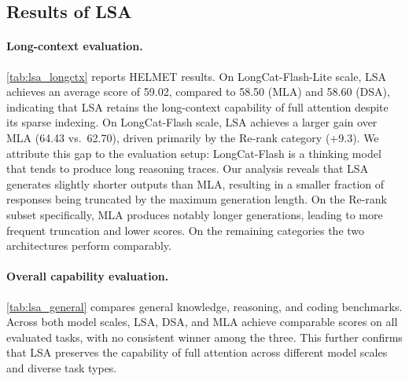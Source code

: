 \documentclass{article}
\newcommand{\longcat}{LongCat-Flash-Lite\xspace}
\begin{document}
\subsection{Results of LSA}
\label{sec:exp_results}

\paragraph{Long-context evaluation.}
\cref{tab:lsa_longctx} reports HELMET results. On \longcat scale, LSA achieves an average score of 59.02, compared to 58.50 (MLA) and 58.60 (DSA), indicating that LSA retains the long-context capability of full attention despite its sparse indexing. On LongCat-Flash scale, LSA achieves a larger gain over MLA (64.43 vs.\ 62.70), driven primarily by the Re-rank category (+9.3). We attribute this gap to the evaluation setup: LongCat-Flash is a thinking model that tends to produce long reasoning traces. Our analysis reveals that LSA generates slightly shorter outputs than MLA, resulting in a smaller fraction of responses being truncated by the maximum generation length. On the Re-rank subset specifically, MLA produces notably longer generations, leading to more frequent truncation and lower scores. On the remaining categories the two architectures perform comparably.

\paragraph{Overall capability evaluation.}
\cref{tab:lsa_general} compares general knowledge, reasoning, and coding benchmarks. Across both model scales, LSA, DSA, and MLA achieve comparable scores on all evaluated tasks, with no consistent winner among the three. This further confirms that LSA preserves the capability of full attention across different model scales and diverse task types.
\end{document}
